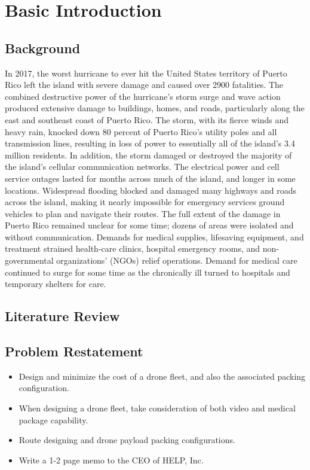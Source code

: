 \MinParskip{}

\section{Basic Introduction}

\subsection{Background}
In 2017, the worst hurricane to ever hit the United States territory of Puerto Rico left the island with severe damage and caused over 2900 fatalities. The combined destructive power of the hurricane's storm surge and wave action produced extensive damage to buildings, homes, and roads, particularly along the east and southeast coast of Puerto Rico. The storm, with its fierce winds and heavy rain, knocked down 80 percent of Puerto Rico's utility poles and all transmission lines, resulting in loss of power to essentially all of the island's 3.4 million residents. In addition, the storm damaged or destroyed the majority of the island's cellular communication networks. The electrical power and cell service outages lasted for months across much of the island, and longer in some locations. Widespread flooding blocked and damaged many highways and roads across the island, making it nearly impossible for emergency services ground vehicles to plan and navigate their routes. The full extent of the damage in Puerto Rico remained unclear for some time; dozens of areas were isolated and without communication. Demands for medical supplies, lifesaving equipment, and treatment strained health-care clinics, hospital emergency rooms, and non-governmental organizations' (NGOs) relief operations. Demand for medical care continued to surge for some time as the chronically ill turned to hospitals and temporary shelters for care.

\subsection{Literature Review}


\subsection{Problem Restatement}
\begin{itemize}
    \item Design and minimize the cost of a drone fleet, and also the associated packing configuration.
    \item When designing a drone fleet, take consideration of both video and medical package capability.
    \item Route designing and drone payload packing configurations.
    \item Write a 1-2 page memo to the CEO of HELP, Inc.
\end{itemize}

